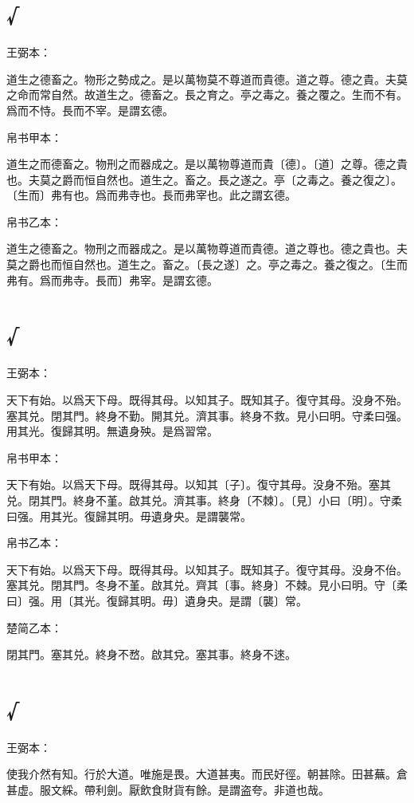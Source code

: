 \documentclass[a5paper]{ctexbook}
\begin{document}
    \chapter{√}
    王弼本：

    道生之德畜之。物形之勢成之。是以萬物莫不尊道而貴德。道之尊。德之貴。夫莫之命而常自然。故道生之。德畜之。長之育之。亭之毒之。養之覆之。生而不有。爲而不恃。長而不宰。是謂玄德。

    
    帛书甲本：

    道生之而德畜之。物刑之而器成之。是以萬物尊道而貴〔德〕。〔道〕之尊。德之貴也。夫莫之爵而恒自然也。道生之。畜之。長之遂之。亭〔之毒之。養之復之〕。〔生而〕弗有也。爲而弗寺也。長而弗宰也。此之謂玄德。

    帛书乙本：

    道生之德畜之。物刑之而器成之。是以萬物尊道而貴德。道之尊也。德之貴也。夫莫之爵也而恒自然也。道生之。畜之。〔長之遂〕之。亭之毒之。養之復之。〔生而弗有。爲而弗寺。長而〕弗宰。是謂玄德。

    \chapter{√}
    王弼本：

    天下有始。以爲天下母。既得其母。以知其子。既知其子。復守其母。没身不殆。塞其兑。閉其門。終身不勤。開其兑。濟其事。終身不救。見小曰明。守柔曰强。用其光。復歸其明。無遺身殃。是爲習常。

    
    帛书甲本：

    天下有始。以爲天下母。既得其母。以知其〔子〕。復守其母。没身不殆。塞其兑。閉其門。終身不堇。啟其兑。濟其事。終身〔不棘〕。〔見〕小曰〔明〕。守柔曰强。用其光。復歸其明。毋遺身央。是謂襲常。

    帛书乙本：

    天下有始。以爲天下母。既得其母。以知其子。既知其子。復守其母。没身不佁。塞其兑。閉其門。冬身不堇。啟其兑。齊其〔事。終身〕不棘。見小曰明。守〔柔曰〕强。用〔其光。復歸其明。毋〕遺身央。是謂〔襲〕常。

    楚简乙本：

    閉其門。塞其兑。終身不嵍。啟其兌。塞其事。終身不逨。

    \chapter{√}
    王弼本：

    使我介然有知。行於大道。唯施是畏。大道甚夷。而民好徑。朝甚除。田甚蕪。倉甚虚。服文綵。帶利劍。厭飲食財貨有餘。是謂盗夸。非道也哉。
\end{document}
